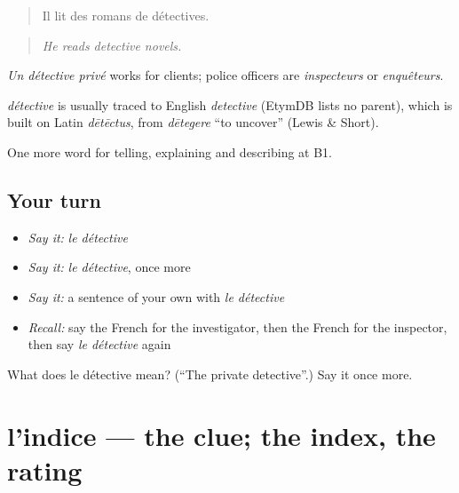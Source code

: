 \begin{quote}
Il lit des romans de détectives.
\end{quote}

\begin{quote}
\emph{He reads detective novels.}
\end{quote}

\emph{Un détective privé} works for clients; police officers are \emph{inspecteurs} or \emph{enquêteurs}.

\begin{cousinweb}
\emph{détective} is usually traced to English \emph{detective} (EtymDB lists no parent), which is built on Latin \emph{dētēctus}, from \emph{dētegere} \textquotedblleft{}to uncover\textquotedblright{} (Lewis \& Short).
\end{cousinweb}

\begin{grammarlens}[title={What you've built}]
One more word for telling, explaining and describing at B1.
\end{grammarlens}

\subsection*{Your turn}
\begin{itemize}
\raggedright
  \item \emph{Say it:} \emph{le détective}
  \item \emph{Say it:} \emph{le détective}, once more
  \item \emph{Say it:} a sentence of your own with \emph{le détective}
  \item \emph{Recall:} say the French for the investigator, then the French for the inspector, then say \emph{le détective} again
\end{itemize}

\begin{tcolorbox}[breakable,colback=teal!4,colframe=teal!35!black,title={Before you move on}]
What does le détective mean? (\textquotedblleft{}The private detective\textquotedblright{}.) Say it once more.
\end{tcolorbox}
\section[l'indice]{l'indice — the clue; the index, the rating}

\label{lesson:FR-C292-indice}



